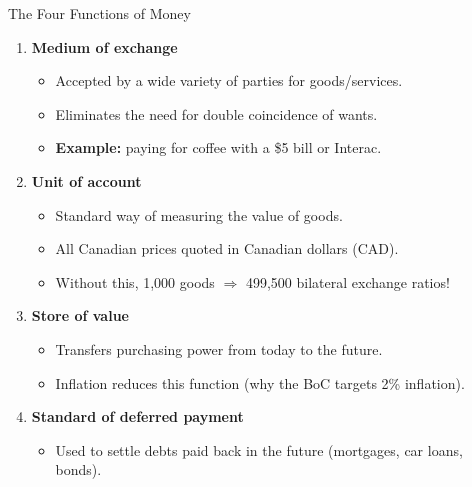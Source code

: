 \documentclass[aspectratio=169]{beamer}
\begin{document}
\begin{frame}{The Four Functions of Money}
\transfade
\begin{enumerate}[<+->]
  \item \textbf{Medium of exchange}
  \begin{itemize}[<+->]
    \item Accepted by a wide variety of parties for goods/services.
    \item Eliminates the need for double coincidence of wants.
    \item \textbf{Example:} paying for coffee with a \$5 bill or Interac.
  \end{itemize}
  \item \textbf{Unit of account}
  \begin{itemize}[<+->]
    \item Standard way of measuring the value of goods.
    \item All Canadian prices quoted in \alert{Canadian dollars (CAD)}.
    \item Without this, 1{,}000 goods $\Rightarrow$ 499{,}500 bilateral exchange ratios!
  \end{itemize}
  \item \textbf{Store of value}
  \begin{itemize}[<+->]
    \item Transfers purchasing power from today to the future.
    \item \alert{Inflation} reduces this function (why the BoC targets 2\% inflation).
  \end{itemize}
  \item \textbf{Standard of deferred payment}
  \begin{itemize}[<+->]
    \item Used to settle debts paid back in the future (mortgages, car loans, bonds).
  \end{itemize}
\end{enumerate}
\end{frame}
\end{document}
